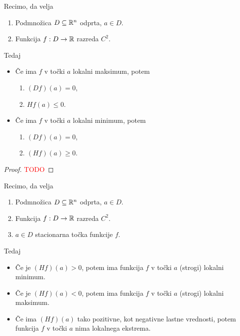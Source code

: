 \begin{trditev}
    Recimo, da velja
    \begin{enumerate}
        \item Podmnožica $D \subseteq \mathbb{R}^n$ odprta, $a \in D$.
        \item Funkcija $f: D \to \mathbb{R}$ razreda $C^2$.
    \end{enumerate}
    Tedaj
    \begin{itemize}
        \item Če ima $f$ v točki $a$ lokalni maksimum, potem
        \begin{enumerate}
            \item $(Df)(a) = 0$,
            \item $Hf(a) \leq 0$.
        \end{enumerate}
        \item Če ima $f$ v točki $a$ lokalni minimum, potem
        \begin{enumerate}
            \item $(Df)(a) = 0$,
            \item $(Hf)(a) \geq 0$.
        \end{enumerate}
    \end{itemize}
\end{trditev}

\begin{proof}
    \textcolor{red}{TODO}
\end{proof}

\newpage
\begin{izrek}
    Recimo, da velja
    \begin{enumerate}
        \item Podmnožica $D \subseteq \mathbb{R}^n$ odprta, $a \in D$.
        \item Funkcija $f: D \to \mathbb{R}$ razreda $C^2$.
        \item $a \in D$ stacionarna točka funkcije $f$.
    \end{enumerate}
    Tedaj
    \begin{itemize}
        \item Če je $(Hf)(a) > 0$, potem ima funkcija $f$ v točki $a$ (strogi) lokalni minimum.
        \item Če je $(Hf)(a) < 0$, potem ima funkcija $f$ v točki $a$ (strogi) lokalni maksimum.
        \item Če ima $(Hf)(a)$ tako pozitivne, kot negativne lastne vrednosti, potem funkcija $f$ v točki $a$ nima lokalnega ekstrema.
    \end{itemize}
\end{izrek}

